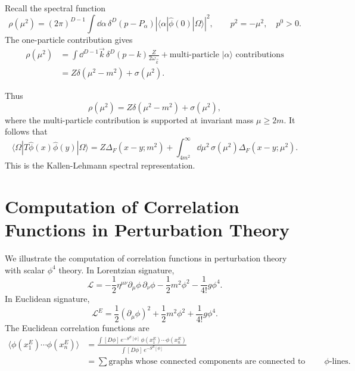 Recall the spectral function
\[
  \rho(\mu^2)
  =
  (2\pi)^{D-1}
  \int\dd\alpha\,
  \delta^D(p-P_\alpha)
  \left|\langle\alpha|\hat\phi(0)|\Omega\rangle\right|^2,
  \qquad
  p^2=-\mu^2,\quad p^0>0.
\]
The one-particle contribution gives
\[
\begin{aligned}
  \rho(\mu^2)
  &=
  \int\dd^{D-1}\vec k\,
  \delta^D(p-k)
  \frac{Z}{2\omega_{\vec k}}
  +
  \text{multi-particle }|\alpha\rangle\text{ contributions}  \\
  &=
  Z\delta(\mu^2-m^2)+\sigma(\mu^2).
\end{aligned}
\]

\begin{center}
\end{center}

Thus
\[
  \rho(\mu^2)
  =
  Z\delta(\mu^2-m^2)+\sigma(\mu^2),
\]
where the multi-particle contribution is supported at invariant mass
\(\mu\ge 2m\). It follows that
\[
  \langle\Omega|T\hat\phi(x)\hat\phi(y)|\Omega\rangle
  =
  Z\Delta_F(x-y;m^2)
  +
  \int_{4m^2}^{\infty}\dd\mu^2\,
  \sigma(\mu^2)\Delta_F(x-y;\mu^2).
\]
This is the Kallen-Lehmann spectral representation.

\section{Computation of Correlation Functions in Perturbation Theory}

We illustrate the computation of correlation functions in perturbation theory
with scalar \(\phi^4\) theory. In Lorentzian signature,
\[
  \mathcal L
  =
  -\frac12\eta^{\mu\nu}\partial_\mu\phi\,\partial_\nu\phi
  -\frac12m^2\phi^2
  -\frac{1}{4!}g\phi^4 .
\]
In Euclidean signature,
\[
  \mathcal L^E
  =
  \frac12(\partial_\mu\phi)^2
  +\frac12m^2\phi^2
  +\frac{1}{4!}g\phi^4 .
\]
The Euclidean correlation functions are
\[
\begin{aligned}
  \langle\phi(x_1^E)\cdots\phi(x_n^E)\rangle
  &=
  \frac{
    \int[D\phi]\,
    e^{-S^E[\phi]}\,
    \phi(x_1^E)\cdots\phi(x_n^E)
  }{
    \int[D\phi]\,e^{-S^E[\phi]}
  }  \\
  &=
  \sum
  \text{graphs whose connected components are connected to external }
  \phi\text{-lines}.
\end{aligned}
\]

